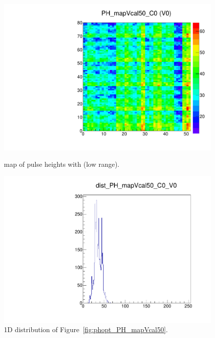 \begin{figure}[!htp]
\centering
\begin{minipage}{0.45\textwidth}
  \includegraphics[width=1.0\textwidth]{figures/phopt_PH_mapVcal50.pdf}
  \caption{\roc map of pulse heights with  (low range).}
  \label{fig:phopt_PH_mapVcal50}
\end{minipage}
\hspace{0.3cm}
\begin{minipage}{0.45\textwidth}
  \includegraphics[width=1.0\textwidth]{figures/phopt_dist_PH_mapVcal50.pdf}
  \caption{1D distribution of Figure~\ref{fig:phopt_PH_mapVcal50}.}
  \label{fig:phopt_dist_PH_mapVcal50}
\end{minipage}
\end{figure}



